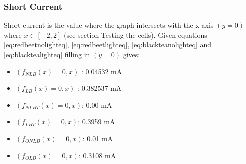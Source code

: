 \documentclass[conference]{IEEEtran}
\begin{document}
\subsubsection{Short Current}
Short current is the value where the graph intersects with the x-axis $(y = 0)$ where $x \in [-2, 2]$ (see section Testing the cells).
Given equations \ref{eq:redbeetnolighteq}, \ref{eq:redbeetlighteq}, \ref{eq:blackteanolighteq} and \ref{eq:blacktealighteq} filling in $(y = 0)$ gives:
\begin{itemize}
 \item$(f_{NLB}(x) = 0, x)$ : 0.04532 mA
 \item$(f_{LB}(x) = 0, x)$ : 0.382537 mA
 \item$(f_{NLBT}(x) = 0, x)$: 0.00 mA
 \item$(f_{LBT}(x) = 0, x)$: 0.3959 mA
 \item$(f_{ONLB}(x) = 0, x)$: 0.01 mA
 \item$(f_{OLB}(x) = 0, x)$: 0.3108 mA
\end{itemize}
\end{document}
